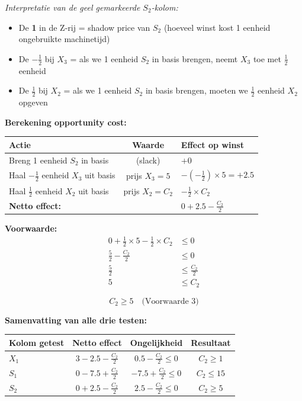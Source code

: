 \documentclass[a4paper,11pt]{article}
\begin{document}
\begin{oefenblok}[title=Productie Optimalisatie bij een Bedrijf]
\textit{Interpretatie van de geel gemarkeerde $S_2$-kolom:}
\begin{itemize}
    \item De \textbf{1} in de Z-rij = shadow price van $S_2$ (hoeveel winst kost 1 eenheid ongebruikte machinetijd)
    \item De \textbf{$-\frac{1}{2}$} bij $X_3$ = als we 1 eenheid $S_2$ in basis brengen, neemt $X_3$ toe met $\frac{1}{2}$ eenheid
    \item De \textbf{$\frac{1}{2}$} bij $X_2$ = als we 1 eenheid $S_2$ in basis brengen, moeten we $\frac{1}{2}$ eenheid $X_2$ opgeven
\end{itemize}

\textbf{Berekening opportunity cost:}

\begin{center}
\begin{tabular}{l|c|l}
\hline
\textbf{Actie} & \textbf{Waarde} & \textbf{Effect op winst} \\
\hline
Breng 1 eenheid $S_2$ in basis & (slack) & $+0$ \\
Haal $-\frac{1}{2}$ eenheid $X_3$ uit basis & prijs $X_3 = 5$ & $-(-\frac{1}{2}) \times 5 = +2.5$ \\
Haal $\frac{1}{2}$ eenheid $X_2$ uit basis & prijs $X_2 = C_2$ & $-\frac{1}{2} \times C_2$ \\
\hline
\multicolumn{2}{l|}{\textbf{Netto effect:}} & $0 + 2.5 - \frac{C_2}{2}$ \\
\hline
\end{tabular}
\end{center}

\textbf{Voorwaarde:}
\begin{align*}
0 + \frac{1}{2} \times 5 - \frac{1}{2} \times C_2 &\leq 0 \\
\frac{5}{2} - \frac{C_2}{2} &\leq 0 \\
\frac{5}{2} &\leq \frac{C_2}{2} \\
5 &\leq C_2
\end{align*}

$$\boxed{C_2 \geq 5} \quad \text{(Voorwaarde 3)}$$

\textbf{Samenvatting van alle drie testen:}

\begin{center}
\begin{tabular}{|l|c|c|c|}
\hline
\textbf{Kolom getest} & \textbf{Netto effect} & \textbf{Ongelijkheid} & \textbf{Resultaat} \\
\hline
$X_1$ & $3 - 2.5 - \frac{C_2}{2}$ & $0.5 - \frac{C_2}{2} \leq 0$ & $C_2 \geq 1$ \\
\hline
$S_1$ & $0 - 7.5 + \frac{C_2}{2}$ & $-7.5 + \frac{C_2}{2} \leq 0$ & $C_2 \leq 15$ \\
\hline
$S_2$ & $0 + 2.5 - \frac{C_2}{2}$ & $2.5 - \frac{C_2}{2} \leq 0$ & $C_2 \geq 5$ \\
\hline
\end{tabular}
\end{center}


\end{oefenblok}
\end{document}
